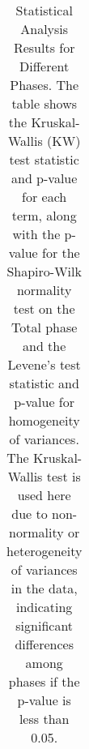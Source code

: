\begin{table}[!htbp]
\begin{tabular}{lrrrrr}
\bottomrule
\bottomrule
\end{tabular}
\caption{Statistical Analysis Results for Different Phases. The table shows the Kruskal-Wallis (KW) test statistic and p-value for each term, along with the p-value for the Shapiro-Wilk normality test on the Total phase and the Levene's test statistic and p-value for homogeneity of variances. The Kruskal-Wallis test is used here due to non-normality or heterogeneity of variances in the data, indicating significant differences among phases if the p-value is less than 0.05.}
\label{tab:stat_analysis}
\end{table}
